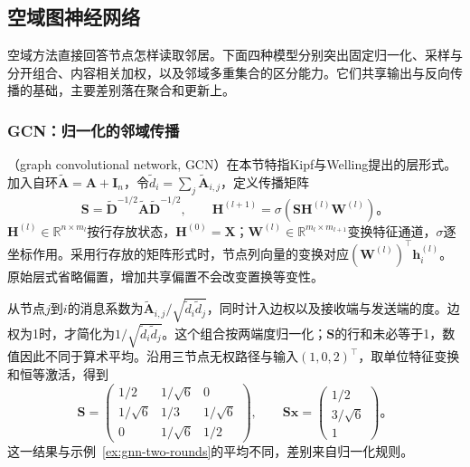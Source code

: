 \subsection{空域图神经网络}
\label{sec:gnn-spatial}

空域方法直接回答节点怎样读取邻居。下面四种模型分别突出固定归一化、采样与分开组合、内容相关加权，以及邻域多重集合的区分能力。它们共享输出与反向传播的基础，主要差别落在聚合和更新上。

\subsubsection{GCN：归一化的邻域传播}
\label{sec:gnn-gcn}

（graph convolutional network, GCN）在本节特指Kipf与Welling提出的层形式。加入自环$\widetilde{\bm{A}}=\bm{A}+\bm{I}_n$，令$\widetilde d_i=\sum_j\widetilde{\bm{A}}_{i,j}$，定义传播矩阵
\begin{equation}
  \bm{S}=\widetilde{\bm{D}}^{-1/2}\widetilde{\bm{A}}\widetilde{\bm{D}}^{-1/2},
  \qquad
  \bm{H}^{(l+1)}=\sigma\!\left(\bm{S}\bm{H}^{(l)}\bm{W}^{(l)}\right)\text{。}
  \label{eq:gnn-gcn-layer}
\end{equation}
$\bm{H}^{(l)}\in\mathbb{R}^{n\times m_l}$按行存放状态，$\bm{H}^{(0)}=\bm{X}$；$\bm{W}^{(l)}\in\mathbb{R}^{m_l\times m_{l+1}}$变换特征通道，$\sigma$逐坐标作用。采用行存放的矩阵形式时，节点列向量的变换对应$(\bm{W}^{(l)})^{\top}\bm{h}_i^{(l)}$。原始层式省略偏置，增加共享偏置不会改变置换等变性。

从节点$j$到$i$的消息系数为$\widetilde{\bm{A}}_{i,j}/\sqrt{\widetilde d_i\widetilde d_j}$，同时计入边权以及接收端与发送端的度。边权为1时，才简化为$1/\sqrt{\widetilde d_i\widetilde d_j}$。这个组合按两端度归一化；$\bm{S}$的行和未必等于1，数值因此不同于算术平均。沿用三节点无权路径与输入$(1,0,2)^{\top}$，取单位特征变换和恒等激活，得到
\begin{equation}
  \bm{S}=\begin{pmatrix}
    1/2&1/\sqrt6&0\\
    1/\sqrt6&1/3&1/\sqrt6\\
    0&1/\sqrt6&1/2
  \end{pmatrix},\qquad
  \bm{S}\bm{x}=\begin{pmatrix}1/2\\3/\sqrt6\\1\end{pmatrix}\text{。}
  \label{eq:gnn-gcn-example}
\end{equation}
这一结果与示例~\ref{ex:gnn-two-rounds}的平均不同，差别来自归一化规则。

